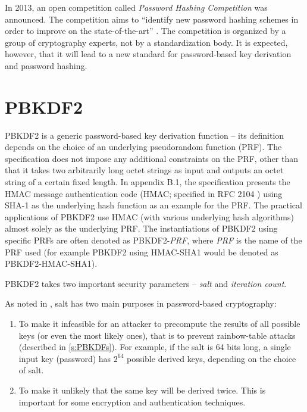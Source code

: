 \documentclass[12pt,oneside]{fithesis2}
\begin{document}
      \label{phc}
      In 2013, an open competition called \emph{Password Hashing Competition} was announced. The competition aims to ``identify new password hashing schemes in order to improve on the state-of-the-art'' \cite{phc}. The competition is organized by a group of cryptography experts, not by a standardization body. It is expected, however, that it will lead to a new standard for password-based key derivation and password hashing.
      
      \section{PBKDF2}\label{s:PBKDF2}
      PBKDF2 is a generic password-based key derivation function -- its definition depends on the choice of an underlying pseudorandom function (PRF). The specification \cite{rfc2898} does not impose any additional constraints on the PRF, other than that it takes two arbitrarily long octet strings as input and outputs an octet string of a certain fixed length. In appendix B.1, the specification presents the HMAC message authentication code (HMAC; specified in RFC 2104 \cite{rfc2104}) using SHA-1 as the underlying hash function as an example for the PRF. The practical applications of PBKDF2 use HMAC (with various underlying hash algorithms) almost solely as the underlying PRF. The instantiations of PBKDF2 using specific PRFs are often denoted as PBKDF2-\emph{PRF}, where \emph{PRF} is the name of the PRF used (for example PBKDF2 using HMAC-SHA1 would be denoted as PBKDF2-HMAC-SHA1).
      
      PBKDF2 takes two important security parameters -- \emph{salt} and \emph{iteration count}.
      
      As noted in \cite[section 4.1]{rfc2898}, salt has two main purposes in password-based cryptography:
      \begin{enumerate}
        \item To make it infeasible for an attacker to precompute the results of all possible keys (or even the most likely ones), that is to prevent rainbow-table attacks (described in \ref{s:PBKDFs}). For example, if the salt is 64 bits long, a single input key (password) has $2^{64}$ possible derived keys, depending on the choice of salt.
        \item To make it unlikely that the same key will be derived twice. This is important for some encryption and authentication techniques.
      \end{enumerate}
      
\end{document}
